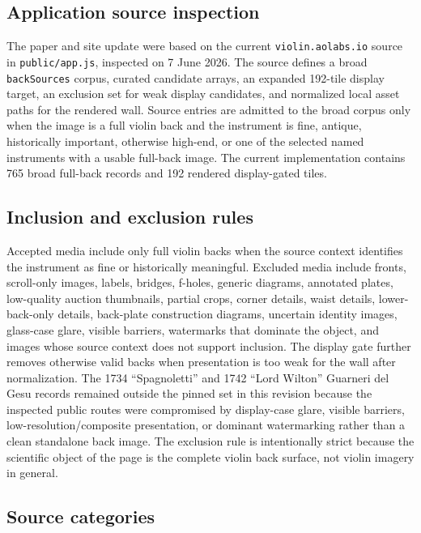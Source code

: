 \documentclass[12pt,letterpaper]{article}
\begin{document}
\subsection*{Application source inspection}

The paper and site update were based on the current \texttt{violin.aolabs.io} source in \texttt{public/app.js}, inspected on 7 June 2026. The source defines a broad \texttt{backSources} corpus, curated candidate arrays, an expanded 192-tile display target, an exclusion set for weak display candidates, and normalized local asset paths for the rendered wall. Source entries are admitted to the broad corpus only when the image is a full violin back and the instrument is fine, antique, historically important, otherwise high-end, or one of the selected named instruments with a usable full-back image. The current implementation contains 765 broad full-back records and 192 rendered display-gated tiles.

\subsection*{Inclusion and exclusion rules}

Accepted media include only full violin backs when the source context identifies the instrument as fine or historically meaningful. Excluded media include fronts, scroll-only images, labels, bridges, f-holes, generic diagrams, annotated plates, low-quality auction thumbnails, partial crops, corner details, waist details, lower-back-only details, back-plate construction diagrams, uncertain identity images, glass-case glare, visible barriers, watermarks that dominate the object, and images whose source context does not support inclusion. The display gate further removes otherwise valid backs when presentation is too weak for the wall after normalization. The 1734 ``Spagnoletti'' and 1742 ``Lord Wilton'' Guarneri del Gesu records remained outside the pinned set in this revision because the inspected public routes were compromised by display-case glare, visible barriers, low-resolution/composite presentation, or dominant watermarking rather than a clean standalone back image. The exclusion rule is intentionally strict because the scientific object of the page is the complete violin back surface, not violin imagery in general.

\subsection*{Source categories}
\end{document}
